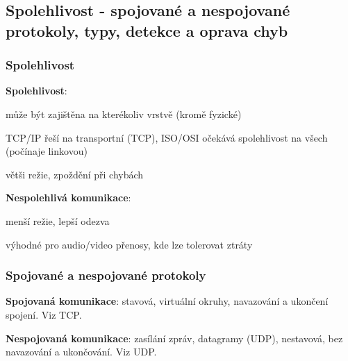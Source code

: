 \subsection{Spolehlivost - spojované a nespojované protokoly, typy, detekce a oprava chyb}

\subsubsection*{Spolehlivost}

\textbf{Spolehlivost}:
\begin{pitemize}
	\item může být zajištěna na kterékoliv vrstvě (kromě fyzické)
	\item TCP/IP řeší na transportní (TCP), ISO/OSI očekává spolehlivost na všech (počínaje linkovou)
	\item větši režie, zpoždění při chybách 
\end{pitemize}

\textbf{Nespolehlivá komunikace}:
\begin{pitemize}
	\item menší režie, lepší odezva
	\item výhodné pro audio/video přenosy, kde lze tolerovat ztráty 
\end{pitemize}

\subsubsection*{Spojované a nespojované protokoly}

\textbf{Spojovaná komunikace}: stavová, virtuální okruhy, navazování a ukončení spojení. Viz TCP.

\textbf{Nespojovaná komunikace}: zasílání zpráv, datagramy (UDP), nestavová, bez navazování a ukončování.  Viz UDP.

